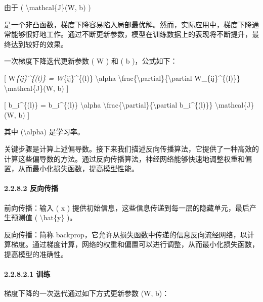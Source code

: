 由于 ( \textbackslash mathcal\{J\}(W, b) )


是一个非凸函数，梯度下降容易陷入局部最优解。然而，实际应用中，梯度下降通常能够很好地工作。通过不断更新参数，模型在训练数据上的表现将不断提升，最终达到较好的效果。

一次梯度下降迭代更新参数 ( W ) 和 ( b )，公式如下：

{[} W\emph{\{ij\}\^{}\{(l)\} = W}\{ij\}\^{}\{(l)\} \textbackslash alpha
\textbackslash frac\{\textbackslash partial\}\{\textbackslash partial
W\_\{ij\}\^{}\{(l)\}\} \textbackslash mathcal\{J\}(W, b) {]}

{[} b\_i\^{}\{(l)\} = b\_i\^{}\{(l)\} \textbackslash alpha
\textbackslash frac\{\textbackslash partial\}\{\textbackslash partial
b\_i\^{}\{(l)\}\} \textbackslash mathcal\{J\}(W, b) {]}


其中 (\textbackslash alpha) 是学习率。

关键步骤是计算上述偏导数。接下来我们描述反向传播算法，它提供了一种高效的计算这些偏导数的方法。通过反向传播算法，神经网络能够快速地调整权重和偏置，从而最小化损失函数，提高模型性能。

\paragraph{\texorpdfstring{\textbf{2.2.8.2}
\textbf{反向传播}}{2.2.8.2 反向传播}}\label{2282-ux53cdux5411ux4f20ux64ad}

前向传播：输入 ( x )
提供初始信息，这些信息传递到每一层的隐藏单元，最后产生预测值 (
\textbackslash hat\{y\} )。

反向传播：简称
backprop，它允许从损失函数中传递的信息反向流经网络，以计算梯度。通过梯度计算，网络的权重和偏置可以进行调整，从而最小化损失函数，提高模型的准确性。

\paragraph{\texorpdfstring{\textbf{2.2.8.2.1
训练}}{2.2.8.2.1 训练}}\label{22821-ux8badux7ec3}

梯度下降的一次迭代通过如下方式更新参数 (W, b)：

